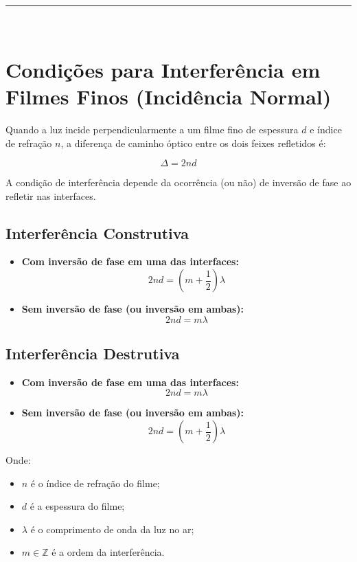 \documentclass[a4paper,12pt]{article}
\begin{document}
\noindent\rule{\linewidth}{0.6pt}\\

\section*{Condições para Interferência em Filmes Finos (Incidência Normal)}

Quando a luz incide perpendicularmente a um filme fino de espessura \( d \) e índice de refração \( n \), a diferença 
de caminho óptico entre os dois feixes refletidos é:

\[
\Delta = 2nd
\]

A condição de interferência depende da ocorrência (ou não) de inversão de fase ao refletir nas interfaces. 

\subsection*{Interferência Construtiva}

\begin{itemize}
  \item \textbf{Com inversão de fase em uma das interfaces:}
  \[
  2nd = \left( m + \frac{1}{2} \right) \lambda
  \]
  
  \item \textbf{Sem inversão de fase (ou inversão em ambas):}
  \[
  2nd = m \lambda
  \]
\end{itemize}

\subsection*{Interferência Destrutiva}

\begin{itemize}
  \item \textbf{Com inversão de fase em uma das interfaces:}
  \[
  2nd = m \lambda
  \]
  
  \item \textbf{Sem inversão de fase (ou inversão em ambas):}
  \[
  2nd = \left( m + \frac{1}{2} \right) \lambda
  \]
\end{itemize}

\noindent Onde:
\begin{itemize}
  \item \( n \) é o índice de refração do filme;
  \item \( d \) é a espessura do filme;
  \item \( \lambda \) é o comprimento de onda da luz no ar;
  \item \( m \in \mathbb{Z} \) é a ordem da interferência.
\end{itemize}
\end{document}
